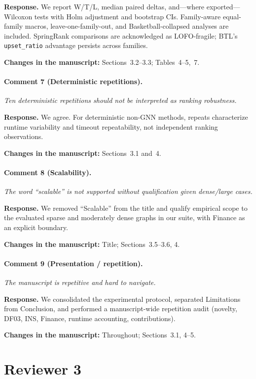 \documentclass[11pt]{article}
\newcommand{\commentbox}[1]{\par\textit{#1}\par\medskip}
\newcommand{\changes}[1]{\textbf{Changes in the manuscript:} #1\par\medskip}
\begin{document}
\noindent\textbf{Response.}
We report W/T/L, median paired deltas, and---where exported---Wilcoxon tests with Holm adjustment and bootstrap CIs. Family-aware equal-family macros, leave-one-family-out, and Basketball-collapsed analyses are included. SpringRank comparisons are acknowledged as LOFO-fragile; BTL's \texttt{upset\_ratio} advantage persists across families.

\changes{Sections~3.2--3.3; Tables~4--5,~7.}

\paragraph{Comment 7 (Deterministic repetitions).}
\commentbox{Ten deterministic repetitions should not be interpreted as ranking robustness.}

\noindent\textbf{Response.}
We agree. For deterministic non-GNN methods, repeats characterize runtime variability and timeout repeatability, not independent ranking observations.

\changes{Sections~3.1 and~4.}

\paragraph{Comment 8 (Scalability).}
\commentbox{The word ``scalable'' is not supported without qualification given dense/large cases.}

\noindent\textbf{Response.}
We removed ``Scalable'' from the title and qualify empirical scope to the evaluated sparse and moderately dense graphs in our suite, with Finance as an explicit boundary.

\changes{Title; Sections~3.5--3.6, 4.}

\paragraph{Comment 9 (Presentation / repetition).}
\commentbox{The manuscript is repetitive and hard to navigate.}

\noindent\textbf{Response.}
We consolidated the experimental protocol, separated Limitations from Conclusion, and performed a manuscript-wide repetition audit (novelty, DF03, INS, Finance, runtime accounting, contributions).

\changes{Throughout; Sections~3.1, 4--5.}

\section*{Reviewer 3}
\end{document}
